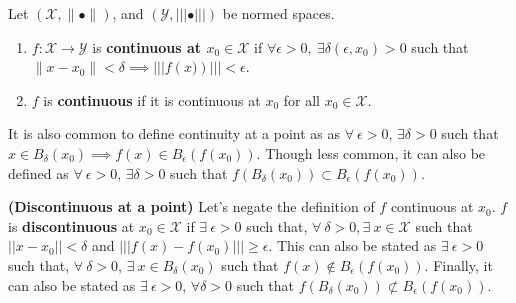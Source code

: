 \begin{definition} Let $\left(\mathcal{X},\| \bullet \|\right)$, and $\left(\mathcal{Y},||| \bullet |||\right)$ be normed spaces.
\begin{enumerate}
       \renewcommand{\labelenumi}{(\alph{enumi})}
        \setlength{\itemsep}{.1cm}
    \item $f:\mathcal{X} \to \mathcal{Y}$ is \textbf{ continuous at $x_0 \in \mathcal{X}$} if $\forall \epsilon > 0,~ \exists  \delta \left(\epsilon, x_0\right) > 0$ such that $ \|x-x_0\| < \delta \implies ||| f\left(x)\right) ||| < \epsilon.$
    
     \item $f$ is \textbf{ continuous} if it is continuous at $x_0$ for all $x_0 \in \mathcal{X}$.
 
\end{enumerate}

\end{definition} 

\begin{rem}
 It is also common to define continuity at a point as as $\forall ~\epsilon>0$, $\exists \delta>0$ such that $ x \in B_{\delta}\left(x_0\right) \implies  f\left(x\right) \in B_{\epsilon}\left(f\left( x_0\right)\right)$. Though less common, it can also be defined as $\forall ~\epsilon>0$, $\exists \delta>0$ such that $ f(B_{\delta}\left(x_0\right)) \subset  B_\epsilon(f(x_0))$.
\end{rem}

\begin{rem} \textbf{(Discontinuous at a point)} Let's negate the definition of $f$ continuous at $x_0$. $f$ is \textbf{discontinuous} at $x_0 \in \mathcal{X}$ if $\exists~\epsilon>0$ such that, $\forall~\delta >0, \exists ~x \in \mathcal{X}$ such that $||x-x_0||< \delta$ and $|||f(x) - f(x_0)||| \ge \epsilon$. This can also be stated as $\exists ~\epsilon>0$ such that, $\forall ~\delta>0$, $\exists~x \in B_\delta(x_0)$ such that $f(x) \not \in B_\epsilon(f(x_0))$. Finally, it can also be stated as $\exists ~\epsilon>0$, $\forall \delta>0$ such that $ f(B_{\delta}\left(x_0\right)) \not \subset  B_\epsilon(f(x_0))$.
\end{rem}

